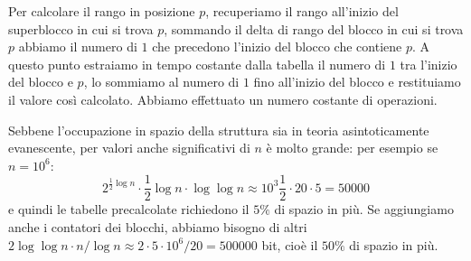 \documentclass[\main/main.tex]{subfiles}
\begin{document}
\begin{definition}
    Per calcolare il rango in posizione \(p\), recuperiamo il rango all'inizio del superblocco in cui si trova \(p\), sommando il delta di rango del blocco in cui si trova \(p\) abbiamo il numero di \(1\) che precedono l'inizio del blocco che contiene \(p\). A questo punto estraiamo in tempo costante dalla tabella il numero di \(1\) tra l'inizio del blocco e \(p\), lo sommiamo al numero di \(1\) fino all'inizio del blocco e restituiamo il valore così calcolato. Abbiamo effettuato un numero costante di operazioni.
\end{definition}
\begin{observation}
    Sebbene l'occupazione in spazio della struttura sia in teoria asintoticamente evanescente, per valori anche significativi di \(n\) è molto grande: per esempio se \(n=10^6\):
    \[
        2^{\frac{1}{2} \log n} \cdot \frac{1}{2} \log n \cdot \log \log n \approx 10^{3} \frac{1}{2} \cdot 20 \cdot 5=50000
    \]
    e quindi le tabelle precalcolate richiedono il \(5\%\) di spazio in più. Se aggiungiamo anche i contatori dei blocchi, abbiamo bisogno di altri \(2 \log \log n \cdot n / \log n \approx 2 \cdot 5 \cdot 10^{6} / 20=500000\) bit, cioè il \(50\%\) di spazio in più.
\end{observation}
\clearpage
\end{document}
